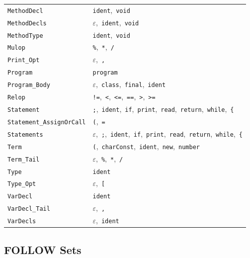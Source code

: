 \documentclass[11pt,a4paper]{article}
\begin{document}
\begin{center}
\begin{tabular}{|L{3.8cm}|L{10.6cm}|}
\texttt{MethodDecl} & \texttt{ident},\ \texttt{void} \\
\texttt{MethodDecls} & $\varepsilon$,\ \texttt{ident},\ \texttt{void} \\
\texttt{MethodType} & \texttt{ident},\ \texttt{void} \\
\texttt{Mulop} & \texttt{\%},\ \texttt{*},\ \texttt{/} \\
\texttt{Print\_Opt} & $\varepsilon$,\ \texttt{,} \\
\texttt{Program} & \texttt{program} \\
\texttt{Program\_Body} & $\varepsilon$,\ \texttt{class},\ \texttt{final},\ \texttt{ident} \\
\texttt{Relop} & \texttt{!=},\ \texttt{<},\ \texttt{<=},\ \texttt{==},\ \texttt{>},\ \texttt{>=} \\
\texttt{Statement} & \texttt{;},\ \texttt{ident},\ \texttt{if},\ \texttt{print},\ \texttt{read},\ \texttt{return},\ \texttt{while},\ \texttt{\{} \\
\texttt{Statement\_AssignOrCall} & \texttt{(},\ \texttt{=} \\
\texttt{Statements} & $\varepsilon$,\ \texttt{;},\ \texttt{ident},\ \texttt{if},\ \texttt{print},\ \texttt{read},\ \texttt{return},\ \texttt{while},\ \texttt{\{} \\
\texttt{Term} & \texttt{(},\ \texttt{charConst},\ \texttt{ident},\ \texttt{new},\ \texttt{number} \\
\texttt{Term\_Tail} & $\varepsilon$,\ \texttt{\%},\ \texttt{*},\ \texttt{/} \\
\texttt{Type} & \texttt{ident} \\
\texttt{Type\_Opt} & $\varepsilon$,\ \texttt{[} \\
\texttt{VarDecl} & \texttt{ident} \\
\texttt{VarDecl\_Tail} & $\varepsilon$,\ \texttt{,} \\
\texttt{VarDecls} & $\varepsilon$,\ \texttt{ident} \\
\hline
\end{tabular}
\end{center}

\subsection{FOLLOW Sets}
\end{document}
